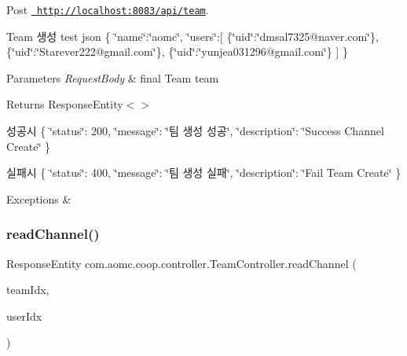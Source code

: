 Post \href{http://localhost:8083/api/team}{\texttt{ http\+://localhost\+:8083/api/team}}. 

Team 생성 test json \{ \char`\"{}name\char`\"{}\+:\char`\"{}aomc\char`\"{}, \char`\"{}users\char`\"{}\+:\mbox{[} \{\char`\"{}uid\char`\"{}\+:\char`\"{}dmsal7325@naver.\+com\char`\"{}\}, \{\char`\"{}uid\char`\"{}\+:\char`\"{}\+Starever222@gmail.\+com\char`\"{}\}, \{\char`\"{}uid\char`\"{}\+:\char`\"{}yunjea031296@gmail.\+com\char`\"{}\} \mbox{]} \}


\begin{DoxyParams}{Parameters}
{\em Request\+Body} & final Team team\\
\hline
\end{DoxyParams}
\begin{DoxyReturn}{Returns}
Response\+Entity$<$$>$
\end{DoxyReturn}
성공시 \{ \char`\"{}status\char`\"{}\+: 200, \char`\"{}message\char`\"{}\+: \char`\"{}팀 생성 성공\char`\"{}, \char`\"{}description\char`\"{}\+: \char`\"{}\+Success Channel Create\char`\"{} \}

실패시 \{ \char`\"{}status\char`\"{}\+: 400, \char`\"{}message\char`\"{}\+: \char`\"{}팀 생성 실패\char`\"{}, \char`\"{}description\char`\"{}\+: \char`\"{}\+Fail Team Create\char`\"{} \}


\begin{DoxyExceptions}{Exceptions}
{\em } & \\
\hline
\end{DoxyExceptions}
\mbox{\label{classcom_1_1aomc_1_1coop_1_1controller_1_1_team_controller_a890d22a6a53400482037c0587483b67d}} 
\subsubsection{\texorpdfstring{readChannel()}{readChannel()}}
{\footnotesize\ttfamily Response\+Entity com.\+aomc.\+coop.\+controller.\+Team\+Controller.\+read\+Channel (\begin{DoxyParamCaption}\item[{@Path\+Variable(value=\char`\"{}team\+Idx\char`\"{}) final int}]{team\+Idx,  }\item[{@Path\+Variable(value=\char`\"{}user\+Idx\char`\"{}) final int}]{user\+Idx }\end{DoxyParamCaption})}



